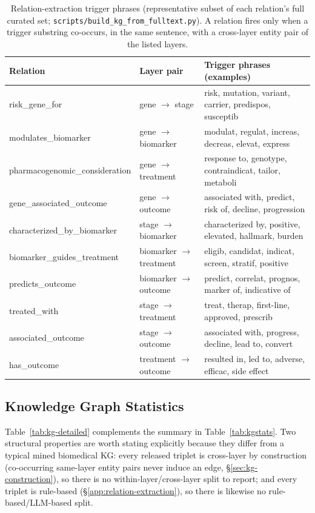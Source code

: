 \documentclass{article}
\begin{document}
\begin{table}[h]
\centering
\caption{Relation-extraction trigger phrases (representative subset of each relation's full curated set; \texttt{scripts/build\_kg\_from\_fulltext.py}). A relation fires only when a trigger substring co-occurs, in the same sentence, with a cross-layer entity pair of the listed layers.}
\label{tab:triggers}
\footnotesize
\begin{tabular}{p{4.1cm}p{1.9cm}p{6.3cm}}
\toprule
\textbf{Relation} & \textbf{Layer pair} & \textbf{Trigger phrases (examples)} \\
\midrule
risk\_gene\_for & gene $\to$ stage & risk, mutation, variant, carrier, predispos, susceptib \\
modulates\_biomarker & gene $\to$ biomarker & modulat, regulat, increas, decreas, elevat, express \\
pharmacogenomic\_consideration & gene $\to$ treatment & response to, genotype, contraindicat, tailor, metaboli \\
gene\_associated\_outcome & gene $\to$ outcome & associated with, predict, risk of, decline, progression \\
characterized\_by\_biomarker & stage $\to$ biomarker & characterized by, positive, elevated, hallmark, burden \\
biomarker\_guides\_treatment & biomarker $\to$ treatment & eligib, candidat, indicat, screen, stratif, positive \\
predicts\_outcome & biomarker $\to$ outcome & predict, correlat, prognos, marker of, indicative of \\
treated\_with & stage $\to$ treatment & treat, therap, first-line, approved, prescrib \\
associated\_outcome & stage $\to$ outcome & associated with, progress, decline, lead to, convert \\
has\_outcome & treatment $\to$ outcome & resulted in, led to, adverse, efficac, side effect \\
\bottomrule
\end{tabular}
\end{table}

\subsection{Knowledge Graph Statistics}
\label{app:kg-stats-detailed}
Table~\ref{tab:kg-detailed} complements the summary in Table~\ref{tab:kgstats}. Two structural properties are worth stating explicitly because they differ from a typical mined biomedical KG: every released triplet is cross-layer by construction (co-occurring same-layer entity pairs never induce an edge, \S\ref{sec:kg-construction}), so there is no within-layer/cross-layer split to report; and every triplet is rule-based (\S\ref{app:relation-extraction}), so there is likewise no rule-based/LLM-based split.
\end{document}
